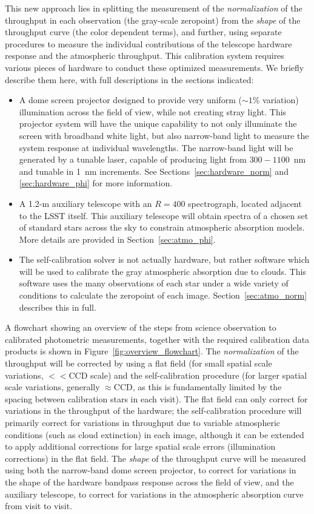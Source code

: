\documentclass[12pt,preprint]{aastex}
\begin{document}
This new approach lies in splitting the measurement of the {\it
normalization} of the throughput in each observation (the gray-scale
zeropoint) from the {\it shape} of the throughput curve (the color
dependent terms), and further, using separate procedures to measure
the individual contributions of the telescope hardware response and
the atmospheric throughput. This calibration system requires various
pieces of hardware to conduct these optimized measurements. We briefly
describe them here, with full descriptions in the sections indicated:
\begin{itemize}
\item{A dome screen projector designed to provide very uniform
    ($\sim1\%$ variation) illumination across the field of view, while
    not creating stray light. This projector system will have the unique
    capability to not only illuminate the screen with broadband white
    light, but also narrow-band light to measure the system response
    at individual wavelengths. The narrow-band light will be generated
    by a tunable laser, capable of producing light from $300-1100$~nm
    and tunable in 1~nm increments. See
    Sections~\ref{sec:hardware_norm} and \ref{sec:hardware_phi} for
    more information.}
\item{A 1.2-m auxiliary telescope with an $R=400$ spectrograph,
    located adjacent to the LSST itself. This auxiliary telescope will
    obtain spectra of a chosen set of standard stars across the sky to
    constrain atmospheric absorption models. More details are provided
  in Section~\ref{sec:atmo_phi}.}
\item{The self-calibration solver is not actually hardware, but rather
    software which will be used to calibrate the gray atmospheric
    absorption due to clouds. This software uses the many observations
    of each star under a wide variety of conditions to calculate the
    zeropoint of each image. Section~\ref{sec:atmo_norm} describes
    this in full.}
\end{itemize}

A flowchart showing an overview of the steps from science observation
to calibrated photometric measurements, together with the required
calibration data products is shown in
Figure~\ref{fig:overview_flowchart}.  The {\it normalization} of the
throughput will be corrected by using a flat field (for small spatial
scale variations, $<<$CCD scale) and the self-calibration procedure
(for larger spatial scale variations, generally $\approx$CCD, as this
is fundamentally limited by the spacing between calibration stars in
each visit). The flat field can only correct for variations in the
throughput of the hardware; the self-calibration procedure will
primarily correct for variations in throughput due to variable
atmospheric conditions (such as cloud extinction) in each image,
although it can be extended to apply additional corrections for large
spatial scale errors (illumination corrections) in the flat field. The
{\it shape} of the throughput curve will be measured using both the
narrow-band dome screen projector, to correct for variations in the
shape of the hardware bandpass response across the field of view, and
the auxiliary telescope, to correct for variations in the atmospheric
absorption curve from visit to visit.
\end{document}
